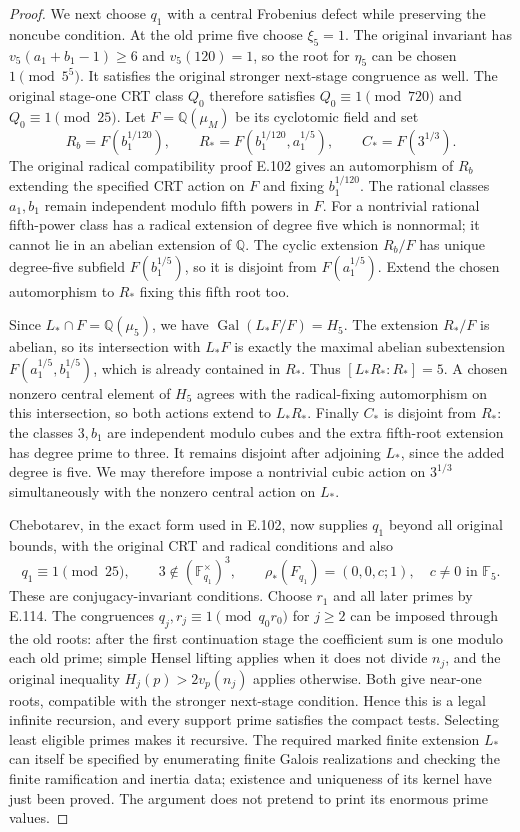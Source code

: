 \begin{proof}
We next choose $q_1$ with a central Frobenius defect while preserving
the noncube condition. At the old prime five choose $\xi_5=1$.
The original invariant has
$v_5(a_1+b_1-1)\ge6$ and $v_5(120)=1$, so the root for $\eta_5$
can be chosen $1\pmod{5^5}$. It satisfies the original stronger
next-stage congruence as well. The original stage-one CRT class
$Q_0$ therefore satisfies $Q_0\equiv1\pmod{720}$ and
$Q_0\equiv1\pmod{25}$. Let $F=\mathbb Q(\mu_M)$ be its
cyclotomic field and set
\[
 R_b=F(b_1^{1/120}),\qquad
 R_*=F(b_1^{1/120},a_1^{1/5}),\qquad
 C_*=F(3^{1/3}).
\]
The original radical compatibility proof E.102 gives an automorphism
of $R_b$ extending the specified CRT action on $F$ and fixing
$b_1^{1/120}$. The rational classes $a_1,b_1$ remain independent
modulo fifth powers in $F$. For a nontrivial rational fifth-power
class has a radical extension of degree five which is nonnormal;
it cannot lie in an abelian extension of $\mathbb Q$.
The cyclic extension $R_b/F$ has unique degree-five subfield
$F(b_1^{1/5})$, so it is disjoint from $F(a_1^{1/5})$.
Extend the chosen automorphism to $R_*$ fixing this fifth root too.

Since $L_*\cap F=\mathbb Q(\mu_5)$, we have
$\operatorname{Gal}(L_*F/F)=H_5$. The extension $R_*/F$ is abelian,
so its intersection with $L_*F$ is exactly the maximal abelian
subextension
$F(a_1^{1/5},b_1^{1/5})$, which is already contained in $R_*$.
Thus $[L_*R_*:R_*]=5$. A chosen nonzero central element of $H_5$
agrees with the radical-fixing automorphism on this intersection,
so both actions extend to $L_*R_*$. Finally $C_*$ is disjoint
from $R_*$: the classes $3,b_1$ are independent modulo cubes and
the extra fifth-root extension has degree prime to three.
It remains disjoint after adjoining $L_*$, since the added degree
is five. We may therefore impose a nontrivial cubic action on
$3^{1/3}$ simultaneously with the nonzero central action on $L_*$.

Chebotarev, in the exact form used in E.102, now supplies $q_1$
beyond all original bounds, with the original CRT and radical
conditions and also
\[
 q_1\equiv1\pmod{25},\qquad
 3\notin(\mathbb F_{q_1}^\times)^3,\qquad
 \rho_*(F_{q_1})=(0,0,c;1),\quad c\ne0\text{ in }\mathbb F_5.
\]
These are conjugacy-invariant conditions. Choose $r_1$ and all
later primes by E.114. The congruences $q_j,r_j\equiv1\pmod{q_0r_0}$
for $j\ge2$ can be imposed through the old roots: after the first
continuation stage the coefficient sum is one modulo each old
prime; simple Hensel lifting applies when it does not divide $n_j$,
and the original inequality $H_j(p)>2v_p(n_j)$ applies otherwise.
Both give near-one roots, compatible with the stronger next-stage
condition. Hence this is a legal infinite recursion, and every
support prime satisfies the compact tests. Selecting least eligible
primes makes it recursive. The required marked finite extension
$L_*$ can itself be specified by enumerating finite Galois realizations
and checking the finite ramification and inertia data; existence
and uniqueness of its kernel have just been proved. The argument
does not pretend to print its enormous prime values.


\end{proof}

